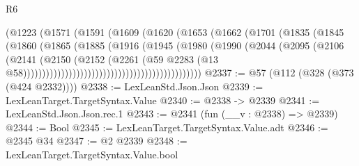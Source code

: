 \begin{lexlean}{R6}
\begin{coremodule}
                                              (@1223
                                                (@1571
                                                  (@1591
                                                    (@1609
                                                      (@1620
                                                        (@1653
                                                          (@1662
                                                            (@1701
                                                              (@1835
                                                                (@1845
                                                                  (@1860
                                                                    (@1865
                                                                      (@1885
                                                                        (@1916
                                                                          (@1945
                                                                            (@1980
                                                                              (@1990
                                                                                (@2044
                                                                                  (@2095
                                                                                    (@2106
                                                                                      (@2141
                                                                                        (@2150
                                                                                          (@2152
                                                                                            (@2261
                                                                                              (@59
                                                                                                @2283
                                                                                                (@13
                                                                                                  @58)))))))))))))))))))))))))))))))))))))))))))))))
@2337 := @57 (@112 (@328 (@373 (@424 @2332))))
@2338 := LexLeanStd.Json.Json
@2339 := LexLeanTarget.TargetSyntax.Value
@2340 := @2338 -> @2339
@2341 := LexLeanStd.Json.Json.rec.{1}
@2343 := @2341 (fun (__v : @2338) => @2339)
@2344 := Bool
@2345 := LexLeanTarget.TargetSyntax.Value.adt
@2346 := @2345 @34
@2347 := @2 @2339
@2348 := LexLeanTarget.TargetSyntax.Value.bool

\end{coremodule}
\end{lexlean}
